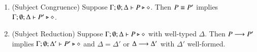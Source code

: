 \begin{theorem}\label{t:sr}%
	\begin{enumerate}[1.]
		\item	(Subject Congruence) Suppose $\Gamma; \emptyset; \Delta \vdash P \triangleright \diamond$.
			Then $P \equiv P'$ implies $\Gamma; \emptyset; \Delta \vdash P' \triangleright \diamond$.

		\item	(Subject Reduction) Suppose $\Gamma; \emptyset; \Delta \vdash P \triangleright \diamond$
			with
			well-typed $\Delta$. 
			Then $P \longrightarrow P'$ implies $\Gamma; \emptyset; \Delta'  \vdash P' \triangleright \diamond$
			and $\Delta = \Delta'$ or $\Delta \longrightarrow \Delta'$
with $\Delta'$ well-formed. 
	\end{enumerate}
\end{theorem}
